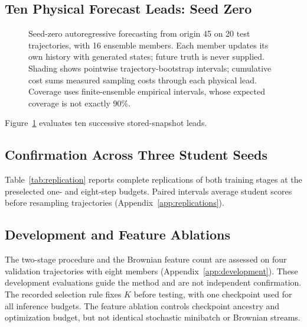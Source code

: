 \subsection{Ten Physical Forecast Leads: Seed Zero}
\begin{figure}[t]
\centering
{}
\caption{Seed-zero autoregressive forecasting from origin 45 on 20 test trajectories, with 16 ensemble members. Each member updates its own history with generated states; future truth is never supplied. Shading shows pointwise trajectory-bootstrap intervals; cumulative cost sums measured sampling costs through each physical lead. Coverage uses finite-ensemble empirical intervals, whose expected coverage is not exactly 90\%.}
\label{fig:rollout}
\end{figure}
Figure~\ref{fig:rollout} evaluates ten successive stored-snapshot leads. 

\subsection{Confirmation Across Three Student Seeds}
Table~\ref{tab:replication} reports complete replications of both training stages at the preselected one- and eight-step budgets. Paired intervals average student scores before resampling trajectories (Appendix~\ref{app:replications}). 

\subsection{Development and Feature Ablations}
The two-stage procedure and the Brownian feature count are assessed on four validation trajectories with eight members (Appendix~\ref{app:development}). These development evaluations guide the method and are not independent confirmation. The recorded selection rule fixes $K$ before testing, with one checkpoint used for all inference budgets. The feature ablation controls checkpoint ancestry and optimization budget, but not identical stochastic minibatch or Brownian streams. 

